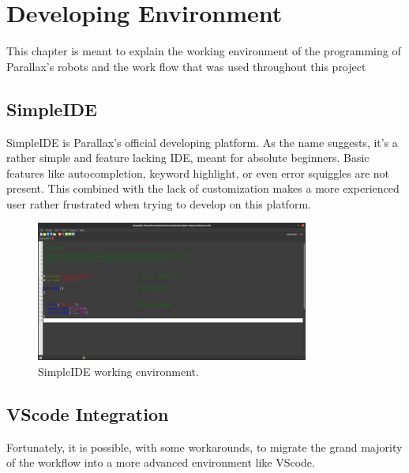 \documentclass{report}
\begin{document}
\section{Developing Environment}

      This chapter is meant to explain the working environment of the
      programming
      of Parallax's robots and the work flow that was used throughout this
      project
      

      \subsection{SimpleIDE}

      SimpleIDE is Parallax's official developing platform. As the name
      suggests, it's a rather simple and feature lacking IDE, meant for absolute
      beginners. Basic features like autocompletion, keyword highlight, or even
      error squiggles are not present. This combined with the lack of
      customization makes a more experienced user rather frustrated when trying
      to develop on this platform. 

      \begin{figure}[h]
            \centering
            \includegraphics[width=0.8\textwidth]{resources/simple_ide.png}
            \caption{\label{fig:simple_ide}SimpleIDE working environment.}
      \end{figure}



      \subsection{VScode Integration}

      Fortunately, it is possible, with some workarounds, to migrate the grand
      majority of the workflow into a more advanced environment like VScode.
      
\end{document}
